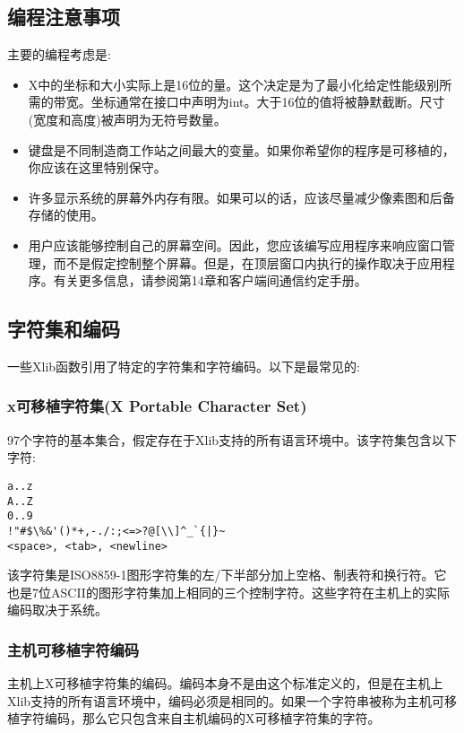 \subsection{编程注意事项}

\noindent 主要的编程考虑是:

\begin{itemize}
	\item X中的坐标和大小实际上是16位的量。这个决定是为了最小化给定性能级别所需的带宽。坐标通常在接口中声明为int。大于16位的值将被静默截断。尺寸(宽度和高度)被声明为无符号数量。
	\item 键盘是不同制造商工作站之间最大的变量。如果你希望你的程序是可移植的，你应该在这里特别保守。
	\item 许多显示系统的屏幕外内存有限。如果可以的话，应该尽量减少像素图和后备存储的使用。
	\item 用户应该能够控制自己的屏幕空间。因此，您应该编写应用程序来响应窗口管理，而不是假定控制整个屏幕。但是，在顶层窗口内执行的操作取决于应用程序。有关更多信息，请参阅第14章和客户端间通信约定手册。
\end{itemize}

\subsection{字符集和编码}

\noindent 一些Xlib函数引用了特定的字符集和字符编码。以下是最常见的:

\subsubsection{x可移植字符集(X Portable Character Set)}

97个字符的基本集合，假定存在于Xlib支持的所有语言环境中。该字符集包含以下字符:

\begin{lstlisting}
a..z
A..Z
0..9
!"#$\%&'()*+,-./:;<=>?@[\\]^_`{|}~
<space>, <tab>, <newline>
\end{lstlisting}

该字符集是ISO8859-1图形字符集的左/下半部分加上空格、制表符和换行符。它也是7位ASCII的图形字符集加上相同的三个控制字符。这些字符在主机上的实际编码取决于系统。

\subsubsection{主机可移植字符编码}

主机上X可移植字符集的编码。编码本身不是由这个标准定义的，但是在主机上Xlib支持的所有语言环境中，编码必须是相同的。如果一个字符串被称为主机可移植字符编码，那么它只包含来自主机编码的X可移植字符集的字符。

